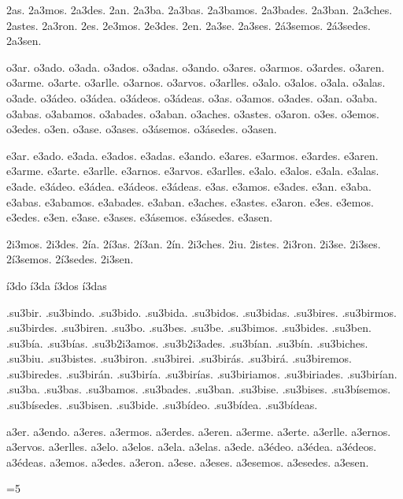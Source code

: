 {{2as. 2a3mos. 2a3des. 2an. 
2a3ba. 2a3bas. 2a3bamos. 2a3bades. 2a3ban. 
2a3ches. 2astes. 2a3ron. 
2es. 2e3mos. 2e3des. 2en. 
2a3se. 2a3ses. 2^^e13semos. 2^^e13sedes. 2a3sen. 

o3ar. o3ado. o3ada. o3ados. o3adas. o3ando. 
o3ares. o3armos. o3ardes. o3aren. 
o3arme. o3arte. o3arlle. o3arnos. o3arvos. o3arlles. 
o3alo. o3alos. o3ala. o3alas. 
o3ade. o3^^e1deo. o3^^e1dea. o3^^e1deos. o3^^e1deas. 
o3as. o3amos. o3ades. o3an. 
o3aba. o3abas. o3abamos. o3abades. o3aban. 
o3aches. o3astes. o3aron. 
o3es. o3emos. o3edes. o3en. 
o3ase. o3ases. o3^^e1semos. o3^^e1sedes. o3asen. 

e3ar. e3ado. e3ada. e3ados. e3adas. e3ando. 
e3ares. e3armos. e3ardes. e3aren. 
e3arme. e3arte. e3arlle. e3arnos. e3arvos. e3arlles. 
e3alo. e3alos. e3ala. e3alas. 
e3ade. e3^^e1deo. e3^^e1dea. e3^^e1deos. e3^^e1deas. 
e3as. e3amos. e3ades. e3an. 
e3aba. e3abas. e3abamos. e3abades. e3aban. 
e3aches. e3astes. e3aron. 
e3es. e3emos. e3edes. e3en. 
e3ase. e3ases. e3^^e1semos. e3^^e1sedes. e3asen. 

2i3mos. 2i3des. 
2^^eda. 2^^ed3as. 2^^ed3an. 
2^^edn. 2i3ches. 2iu. 2istes. 2i3ron. 
2i3se. 2i3ses. 2^^ed3semos. 2^^ed3sedes. 2i3sen. 

^^ed3do ^^ed3da ^^ed3dos ^^ed3das 

.su3bir. .su3bindo. .su3bido. .su3bida. .su3bidos. .su3bidas. 
.su3bires. .su3birmos. .su3birdes. .su3biren. 
.su3bo. .su3bes. .su3be. .su3bimos. .su3bides. .su3ben. 
.su3b^^eda. .su3b^^edas. .su3b2i3amos. .su3b2i3ades. .su3b^^edan. 
.su3b^^edn. .su3biches. .su3biu. .su3bistes. .su3biron. 
.su3birei. .su3bir^^e1s. .su3bir^^e1. .su3biremos. .su3biredes. .su3bir^^e1n. 
.su3bir^^eda. .su3bir^^edas. .su3biriamos. .su3biriades. .su3bir^^edan. 
.su3ba. .su3bas. .su3bamos. .su3bades. .su3ban. 
.su3bise. .su3bises. .su3b^^edsemos. .su3b^^edsedes. .su3bisen. 
.su3bide. .su3b^^eddeo. .su3b^^eddea. .su3b^^eddeas. 

a3er. a3endo. 
a3eres. a3ermos. a3erdes. a3eren. 
a3erme. a3erte. a3erlle. a3ernos. a3ervos. a3erlles. 
a3elo. a3elos. a3ela. a3elas. 
a3ede. a3^^e9deo. a3^^e9dea. a3^^e9deos. a3^^e9deas. 
a3emos. a3edes. a3eron. 
a3ese. a3eses. a3esemos. a3esedes. a3esen. 
}
=5
}
